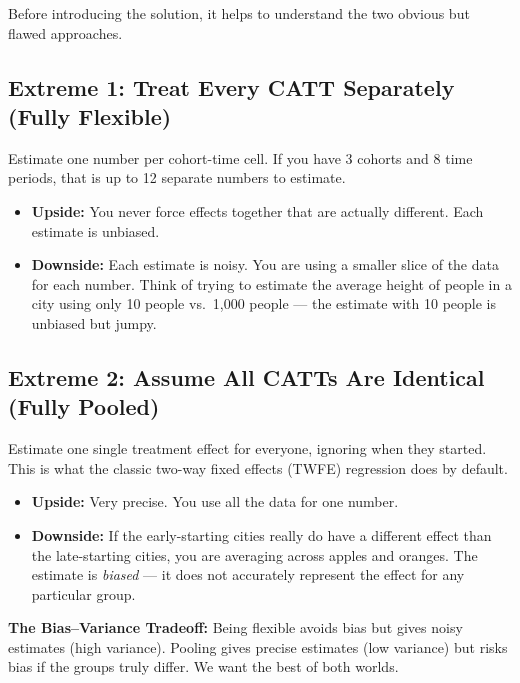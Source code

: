 \documentclass[12pt]{article}
\begin{document}
Before introducing the solution, it helps to understand the two obvious but
flawed approaches.

\subsection{Extreme 1: Treat Every CATT Separately (Fully Flexible)}

Estimate one number per cohort-time cell. If you have 3 cohorts and 8 time
periods, that is up to 12 separate numbers to estimate.

\begin{itemize}
  \item \textbf{Upside:} You never force effects together that are actually
    different. Each estimate is unbiased.
  \item \textbf{Downside:} Each estimate is noisy. You are using a smaller
    slice of the data for each number. Think of trying to estimate the average
    height of people in a city using only 10 people vs.\ 1,000 people ---
    the estimate with 10 people is unbiased but jumpy.
\end{itemize}

\subsection{Extreme 2: Assume All CATTs Are Identical (Fully Pooled)}

Estimate one single treatment effect for everyone, ignoring when they started.
This is what the classic two-way fixed effects (TWFE) regression does by default.

\begin{itemize}
  \item \textbf{Upside:} Very precise. You use all the data for one number.
  \item \textbf{Downside:} If the early-starting cities really do have a
    different effect than the late-starting cities, you are averaging across
    apples and oranges. The estimate is \textit{biased} --- it does not
    accurately represent the effect for any particular group.
\end{itemize}

\begin{warningbox}
\textbf{The Bias--Variance Tradeoff:} Being flexible avoids bias but gives noisy
estimates (high variance). Pooling gives precise estimates (low variance) but
risks bias if the groups truly differ. We want the best of both worlds.
\end{warningbox}
\end{document}
